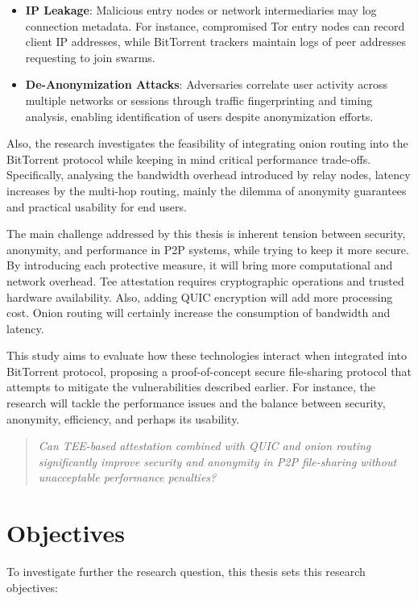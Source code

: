 \begin{itemize}
\begin{itemize}
    \item \textbf{IP Leakage}: Malicious entry nodes or network intermediaries may log connection metadata. For instance, compromised Tor entry nodes can record client IP addresses, while BitTorrent trackers maintain logs of peer addresses requesting to join swarms.

    \item \textbf{De-Anonymization Attacks}: Adversaries correlate user activity across multiple networks or sessions through traffic fingerprinting and timing analysis, enabling identification of users despite anonymization efforts.
  \end{itemize}

  Also, the research investigates the feasibility of integrating onion routing into the BitTorrent protocol while keeping in mind critical performance trade-offs. Specifically, analysing the bandwidth overhead introduced by relay nodes, latency increases by the multi-hop routing, mainly the dilemma of anonymity guarantees and practical usability for end users.

\end{itemize}

The main challenge addressed by this thesis is inherent tension between security, anonymity, and performance in P2P systems, while trying to keep it more secure. By introducing each protective measure, it will bring more computational and network overhead. Tee attestation requires cryptographic operations and trusted hardware availability. Also, adding QUIC encryption will add more processing cost. Onion routing will certainly increase the consumption of bandwidth and latency.

This study aims to evaluate how these technologies interact when integrated into BitTorrent protocol, proposing a proof-of-concept secure file-sharing protocol that attempts to mitigate the vulnerabilities described earlier. For instance, the research will tackle the performance issues and the balance between security, anonymity, efficiency, and perhaps its usability.

\begin{quote}
  \textit{Can TEE-based attestation combined with QUIC and onion routing significantly improve security and anonymity in P2P file-sharing without unacceptable performance penalties?}
\end{quote}

\section{Objectives}
\label{Objectives}
  To investigate further the research question, this thesis sets this research objectives:

